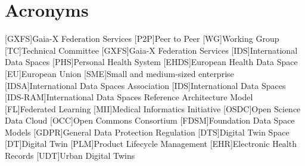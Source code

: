 \chapter{Acronyms}
\begin{acronym}
    [GXFS]{Gaia-X Federation Services}
    [P2P]{Peer to Peer}
    [WG]{Working Group}
    [TC]{Technical Committee}
    [GXFS]{Gaia-X Federation Services}
    [IDS]{International Data Spaces}
    [PHS]{Personal Health System}
    [EHDS]{European Health Data Space}
    [EU]{European Union}
    [SME]{Small and medium-sized enterprise}
    [IDSA]{International Data Spaces Association}
    [IDS]{International Data Spaces}
    [IDS-RAM]{International Data Spaces Reference Architecture Model}
    [FL]{Federated Learning}
    [MII]{Medical Informatics Initiative}
    [OSDC]{Open Science Data Cloud}
    [OCC]{Open Commons Consortium}
    [FDSM]{Foundation Data Space Models}
    [GDPR]{General Data Protection Regulation}
    [DTS]{Digital Twin Space}
    [DT]{Digital Twin}
    [PLM]{Product Lifecycle Management}
    [EHR]{Electronic Health Records}
    [UDT]{Urban Digital Twins}
\end{acronym}%
